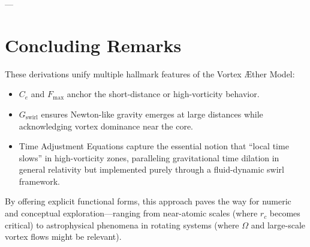 ---

\section{Concluding Remarks}

These derivations unify multiple hallmark features of the Vortex Æther Model:
\begin{itemize}
    \item \(C_e\) and \(F_{\max}\) anchor the short-distance or high-vorticity behavior.
    \item \(G_{\text{swirl}}\) ensures Newton-like gravity emerges at large distances while acknowledging vortex dominance near the core.
    \item Time Adjustment Equations capture the essential notion that “local time slows” in high-vorticity zones, paralleling gravitational time dilation in general relativity but implemented purely through a fluid-dynamic swirl framework.
\end{itemize}

By offering explicit functional forms, this approach paves the way for numeric and conceptual exploration—ranging from near-atomic scales (where \(r_c\) becomes critical) to astrophysical phenomena in rotating systems (where \(\Omega\) and large-scale vortex flows might be relevant).